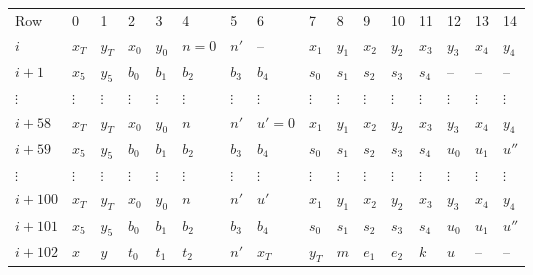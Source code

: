 \begin{center}
    \begin{table}[H]
        \begin{tabular}{llllllllllllllll}
            Row     & 0        & 1        & 2        & 3        & 4        & 5        & 6        & 7        & 8        & 9        & 10       & 11       & 12       & 13       & 14       \\
            $i$    & $x_T$    & $y_T$    & $x_0$    & $y_0$    & $n = 0$    & $n'$    & --    & $x_1$    & $y_1$    & $x_2$    & $y_2$    & $x_3$    & $y_3$ & $x_4$ & $y_4$ \\
            $i + 1$   & $x_5$    & $y_5$    & $b_0$    & $b_1$    & $b_2$    & $b_3$    & $b_4$      & $s_0$    & $s_1$    & $s_2$    & $s_3$    & $s_4$    & -- & -- & -- \\
            $\vdots$  & $\vdots$ & $\vdots$ & $\vdots$ & $\vdots$ & $\vdots$ & $\vdots$ & $\vdots$ & $\vdots$ & $\vdots$ & $\vdots$ & $\vdots$ & $\vdots$ & $\vdots$ & $\vdots$ & $\vdots$ \\
            $i+58$    & $x_T$    & $y_T$    & $x_0$    & $y_0$    & $n$    & $n'$    & $u'=0$    & $x_1$    & $y_1$    & $x_2$    & $y_2$    & $x_3$    & $y_3$ & $x_4$ & $y_4$ \\
            $i + 59$   & $x_5$    & $y_5$    & $b_0$    & $b_1$    & $b_2$    & $b_3$    & $b_4$      & $s_0$    & $s_1$    & $s_2$    & $s_3$    & $s_4$    & $u_0$ & $u_1$ & $u''$ \\

            $\vdots$  & $\vdots$ & $\vdots$ & $\vdots$ & $\vdots$ & $\vdots$ & $\vdots$ & $\vdots$ & $\vdots$ & $\vdots$ & $\vdots$ & $\vdots$ & $\vdots$ & $\vdots$ & $\vdots$ & $\vdots$ \\
            $i+100$    & $x_T$    & $y_T$    & $x_0$    & $y_0$    & $n$    & $n'$    & $u'$    & $x_1$    & $y_1$    & $x_2$    & $y_2$    & $x_3$    & $y_3$ & $x_4$ & $y_4$ \\
            $i + 101$   & $x_5$    & $y_5$    & $b_0$    & $b_1$    & $b_2$    & $b_3$    & $b_4$      & $s_0$    & $s_1$    & $s_2$    & $s_3$    & $s_4$    & $u_0$ & $u_1$ & $u''$ \\
            $i + 102$ & $x$    & $y$    & $t_0$    & $t_1$    & $t_2$    & $n'$    & $x_T$      & $y_T$    & $m$    & $e_1$    & $e_2$    & $k$    & $u$ & -- & -- \\
        \end{tabular}
    \end{table}
\end{center}

